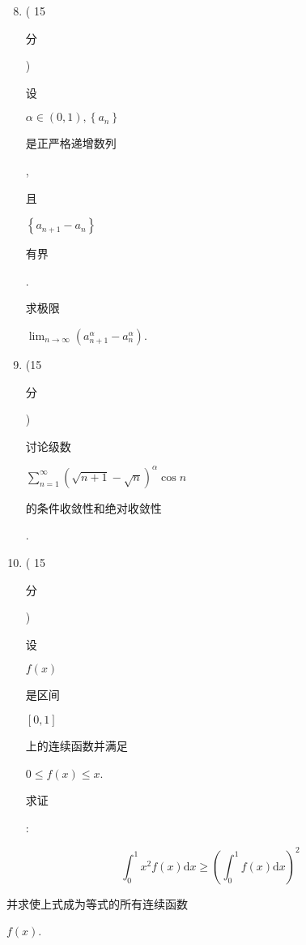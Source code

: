\documentclass[10pt]{article}
\begin{document}
\begin{enumerate}
  \setcounter{enumi}{7}
  \item ( 15 \begin{CJK}{UTF8}{mj}分\end{CJK}) \begin{CJK}{UTF8}{mj}设\end{CJK} $\alpha \in(0,1),\left\{a_{n}\right\}$ \begin{CJK}{UTF8}{mj}是正严格递增数列\end{CJK}, \begin{CJK}{UTF8}{mj}且\end{CJK} $\left\{a_{n+1}-a_{n}\right\}$ \begin{CJK}{UTF8}{mj}有界\end{CJK}. \begin{CJK}{UTF8}{mj}求极限\end{CJK} $\lim _{n \rightarrow \infty}\left(a_{n+1}^{\alpha}-a_{n}^{\alpha}\right)$.

  \item (15 \begin{CJK}{UTF8}{mj}分\end{CJK}) \begin{CJK}{UTF8}{mj}讨论级数\end{CJK} $\sum_{n=1}^{\infty}(\sqrt{n+1}-\sqrt{n})^{\alpha} \cos n$ \begin{CJK}{UTF8}{mj}的条件收敛性和绝对收敛性\end{CJK}.

  \item ( 15 \begin{CJK}{UTF8}{mj}分\end{CJK}) \begin{CJK}{UTF8}{mj}设\end{CJK} $f(x)$ \begin{CJK}{UTF8}{mj}是区间\end{CJK} $[0,1]$ \begin{CJK}{UTF8}{mj}上的连续函数并满足\end{CJK} $0 \leqslant f(x) \leqslant x$. \begin{CJK}{UTF8}{mj}求证\end{CJK}:

\end{enumerate}
$$
\int_{0}^{1} x^{2} f(x) \mathrm{d} x \geqslant\left(\int_{0}^{1} f(x) \mathrm{d} x\right)^{2}
$$
\begin{CJK}{UTF8}{mj}并求使上式成为等式的所有连续函数\end{CJK} $f(x)$.
\end{document}
